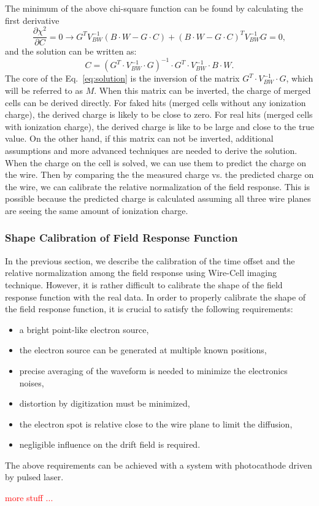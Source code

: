 The minimum of the above chi-square function can be found by calculating the 
first derivative
\begin{equation}
\frac{\partial \chi^2}{\partial C} = 0  \rightarrow
G^{T} V_{BW}^{-1} \left(B\cdot W - G\cdot C\right) +
\left(B\cdot W- G\cdot C\right)^{T} V_{BW}^{-1} G = 0,
\end{equation}
and the solution can be written as:
\begin{equation}\label{eq:solution}
C = \left( G^{T} \cdot V_{BW}^{-1} \cdot G \right)^{-1} \cdot G^{T} \cdot V_{BW}^{-1} \cdot B\cdot W.
\end{equation}
The core of the Eq.~\eqref{eq:solution} is the inversion of the matrix 
$G^{T} \cdot V_{BW}^{-1} \cdot G$, which will be referred to as $M$. 
When this matrix can be inverted, the charge
of merged cells can be derived directly. For faked hits (merged cells without 
any ionization charge), the derived charge is likely to be close to zero. For 
real hits (merged cells with ionization charge), the derived charge is like to be
large and close to the true value. On the other hand, if this matrix can not be
inverted, additional assumptions and more advanced techniques are needed to 
derive the solution. When the charge on the cell is 
solved, we can use them to predict the charge on the wire. Then by comparing the 
the measured charge vs. the predicted charge on the wire, we can calibrate the 
relative normalization of the field response. This is possible because the predicted
charge is calculated assuming all three wire planes are seeing the same amount of 
ionization charge. 


\subsubsection{Shape Calibration of Field Response Function}
In the previous section, we describe the calibration of the time offset and the relative normalization
among the field response using Wire-Cell imaging technique. However, it is rather difficult to 
calibrate the shape of the field response function with the real data. In order to properly 
calibrate the shape of the field response function, it is crucial to satisfy the following requirements:
\begin{itemize}
\item a bright point-like electron source,
\item the electron source can be generated at multiple known positions,
\item precise averaging of the waveform is needed to minimize the electronics noises,
\item distortion by digitization must be minimized,
\item the electron spot is relative close to the wire plane to limit the diffusion,
\item negligible influence on the drift field is required.
\end{itemize}

The above requirements can be achieved with a system with photocathode driven by pulsed laser. 

\textcolor{red}{more stuff ...}